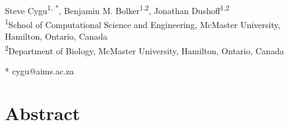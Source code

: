 \begin{flushleft}
{\Large
\textbf{} %
}
\newline
\\
Steve Cygu\textsuperscript{1, *},
Benjamin M. Bolker\textsuperscript{1,2},
Jonathan Dushoff\textsuperscript{1,2}
\\
\bigskip
\textsuperscript{1}School of Computational Science and Engineering, McMaster University, Hamilton, Ontario, Canada
\\
\textsuperscript{2}Department of Biology, McMaster University, Hamilton, Ontario, Canada
\\
\bigskip


* cygu@aims.ac.za

\end{flushleft}
\section*{Abstract}


